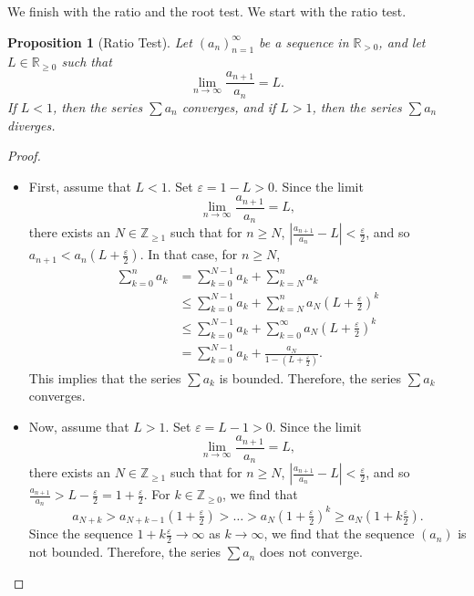 \documentclass[a4paper, openany]{memoir}
\theoremstyle{definition}
\theoremstyle{plain}
\newtheorem{proposition}[definition]{Proposition}
\begin{document}
We finish with the ratio and the root test. We start with the ratio test.
\begin{proposition}[Ratio Test]
Let $(a_n)_{n=1}^{\infty}$ be a sequence in $\mathbb{R}_{> 0}$, and let $L \in \mathbb{R}_{\geqslant 0}$ such that
\[\lim_{n \to \infty} \frac{a_{n+1}}{a_n} = L.\]
If $L < 1$, then the series $\sum a_n$ converges, and if $L > 1$, then the series $\sum a_n$ diverges.
\end{proposition}
\begin{proof}
\hspace*{0pt}
\begin{itemize}
    \item First, assume that $L < 1$. Set $\varepsilon = 1 - L > 0$. Since the limit
    \[\lim_{n \to \infty} \frac{a_{n+1}}{a_n} = L,\]
    there exists an $N \in \mathbb{Z}_{\geqslant 1}$ such that for $n \geqslant N$, $|\frac{a_{n+1}}{a_n} - L| < \frac{\varepsilon}{2}$, and so $a_{n+1} < a_n(L + \frac{\varepsilon}{2})$. In that case, for $n \geqslant N$,
    \begin{align*}
        \sum_{k=0}^n a_k &= \sum_{k=0}^{N-1} a_k + \sum_{k=N}^n a_k \\
        &\leqslant \sum_{k=0}^{N-1} a_k + \sum_{k=N}^n a_N (L + \tfrac{\varepsilon}{2})^k \\
        &\leqslant \sum_{k=0}^{N-1} a_k + \sum_{k=0}^{\infty} a_N (L + \tfrac{\varepsilon}{2})^k \\
        &= \sum_{k=0}^{N-1} a_k + \frac{a_N}{1 - (L + \tfrac{\varepsilon}{2})}.
    \end{align*}
    This implies that the series $\sum a_k$ is bounded. Therefore, the series $\sum a_k$ converges.
    
    \item Now, assume that $L > 1$. Set $\varepsilon = L - 1 > 0$. Since the limit
    \[\lim_{n \to \infty} \frac{a_{n+1}}{a_n} = L,\]
    there exists an $N \in \mathbb{Z}_{\geqslant 1}$ such that for $n \geqslant N$, $|\frac{a_{n+1}}{a_n} - L| < \frac{\varepsilon}{2}$, and so $\frac{a_{n+1}}{a_n} > L - \frac{\varepsilon}{2} = 1 + \frac{\varepsilon}{2}$. For $k \in \mathbb{Z}_{\geqslant 0}$, we find that
    \[a_{N+k} > a_{N+k-1} (1 + \tfrac{\varepsilon}{2}) > \dots > a_N (1 + \tfrac{\varepsilon}{2})^k \geqslant a_N (1 + k \tfrac{\varepsilon}{2}).\]
    Since the sequence $1 + k \frac{\varepsilon}{2} \to \infty$ as $k \to \infty$, we find that the sequence $(a_n)$ is not bounded. Therefore, the series $\sum a_n$ does not converge.
\end{itemize}
\end{proof}
\end{document}
